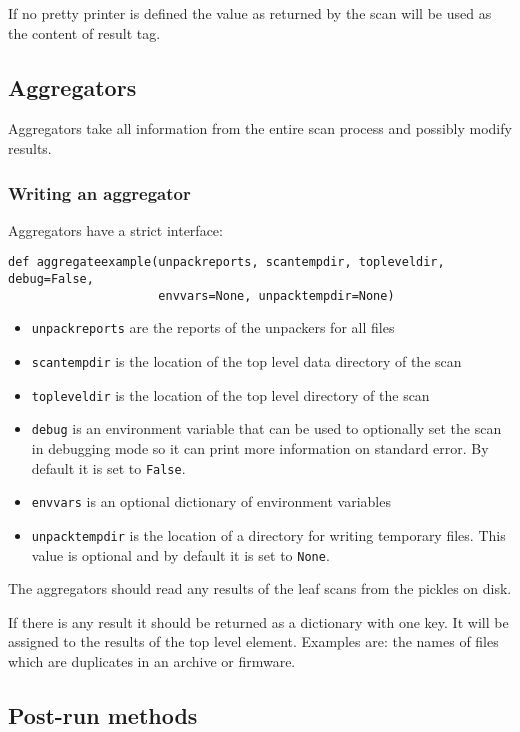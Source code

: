 \documentclass[10pt]{article}
\begin{document}
If no pretty printer is defined the value as returned by the scan will be used
as the content of result tag.

\subsection{Aggregators}

Aggregators take all information from the entire scan process and possibly
modify results.

\subsubsection{Writing an aggregator}

Aggregators have a strict interface:

\begin{verbatim}
def aggregateexample(unpackreports, scantempdir, topleveldir, debug=False,
                     envvars=None, unpacktempdir=None)
\end{verbatim}

\begin{itemize}
\item \texttt{unpackreports} are the reports of the unpackers for all files
\item \texttt{scantempdir} is the location of the top level data directory of
the scan
\item \texttt{topleveldir} is the location of the top level directory of the
scan
\item \texttt{debug} is an environment variable that can be used to optionally
set the scan in debugging mode so it can print more information on standard
error. By default it is set to \texttt{False}.
\item \texttt{envvars} is an optional dictionary of environment variables
\item \texttt{unpacktempdir} is the location of a directory for writing
temporary files. This value is optional and by default it is set to
\texttt{None}.
\end{itemize}

The aggregators should read any results of the leaf scans from the pickles
on disk.

If there is any result it should be returned as a dictionary with one key. It
will be assigned to the results of the top level element. Examples are: the
names of files which are duplicates in an archive or firmware.

\subsection{Post-run methods}
\end{document}
